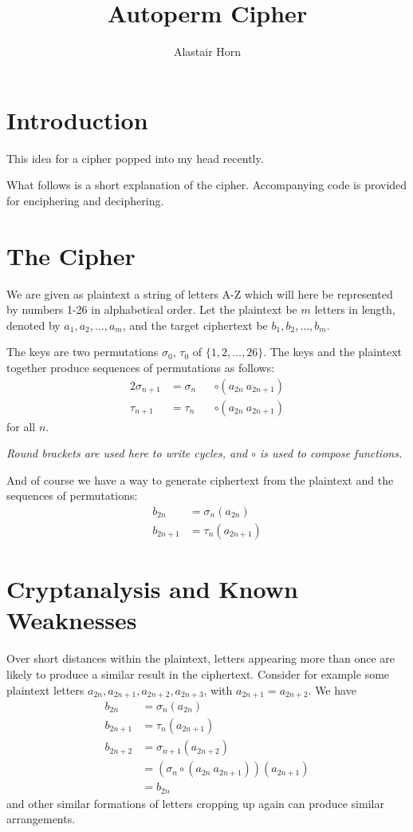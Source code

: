 \documentclass{article}
\title{Autoperm Cipher}
\author{Alastair Horn}
\begin{document}
\maketitle

\section*{Introduction}

This idea for a cipher popped into my head recently.

What follows is a short explanation of the cipher. Accompanying code is provided
for enciphering and deciphering.

\section*{The Cipher}

We are given as plaintext a string of letters A-Z which will here be represented
by numbers 1-26 in alphabetical order. Let the plaintext be \(m\) letters in
length, denoted by \(a_1, a_2, \dotsc, a_m\), and the target ciphertext be
\(b_1, b_2, \dotsc, b_m\).

The keys are two permutations \(\sigma_0\), \(\tau_0\) of
\(\{1, 2, \dotsc, 26\}\). The keys and the plaintext together produce sequences
of permutations as follows:
\begin{alignat*}2
 \sigma_{n + 1} &= \sigma_n && \circ (a_{2n}\ a_{2n + 1}) \\
 \tau_{n + 1}   &= \tau_n   && \circ (a_{2n}\ a_{2n + 1})
\end{alignat*}
for all \(n\).

\emph{Round brackets are used here to write cycles, and \(\circ\) is used to
compose functions.}

And of course we have a way to generate ciphertext from the plaintext and the
sequences of permutations:
\begin{align*}
  b_{2n}     &= \sigma_n(a_{2n}) \\
  b_{2n + 1} &= \tau_n (a_{2n + 1})
\end{align*}

\section*{Cryptanalysis and Known Weaknesses}

Over short distances within the plaintext, letters appearing more than once are 
likely to produce a similar result in the ciphertext.
Consider for example some plaintext letters
$a_{2n}, a_{2n+1}, a_{2n+2}, a_{2n+3}$, with $a_{2n+1} = a_{2n+2}$. We have
\begin{align*}
  b_{2n}   &= \sigma_n(a_{2n}) \\
  b_{2n+1} &= \tau_n(a_{2n+1}) \\
  b_{2n+2} &= \sigma_{n+1}(a_{2n+2})  \\
           &= (\sigma_n \circ (a_{2n}\ a_{2n+1}))(a_{2n+1}) \\
           &= b_{2n}
\end{align*}
and other similar formations of letters cropping up again can produce similar
arrangements.
\end{document}
